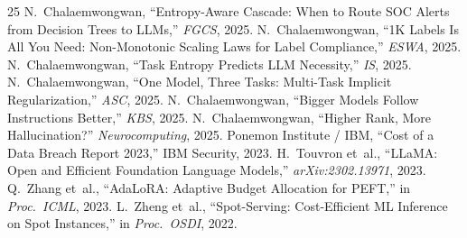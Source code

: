 \documentclass[review,3p]{elsarticle}
\begin{document}
\begin{thebibliography}{25}
 N.~Chalaemwongwan, ``Entropy-Aware Cascade: When to Route SOC Alerts from Decision Trees to LLMs,'' \emph{FGCS}, 2025.
 N.~Chalaemwongwan, ``1K Labels Is All You Need: Non-Monotonic Scaling Laws for Label Compliance,'' \emph{ESWA}, 2025.
 N.~Chalaemwongwan, ``Task Entropy Predicts LLM Necessity,'' \emph{IS}, 2025.
 N.~Chalaemwongwan, ``One Model, Three Tasks: Multi-Task Implicit Regularization,'' \emph{ASC}, 2025.
 N.~Chalaemwongwan, ``Bigger Models Follow Instructions Better,'' \emph{KBS}, 2025.
 N.~Chalaemwongwan, ``Higher Rank, More Hallucination?'' \emph{Neurocomputing}, 2025.
 Ponemon Institute / IBM, ``Cost of a Data Breach Report 2023,'' IBM Security, 2023.
 H.~Touvron et~al., ``LLaMA: Open and Efficient Foundation Language Models,'' \emph{arXiv:2302.13971}, 2023.
 Q.~Zhang et~al., ``AdaLoRA: Adaptive Budget Allocation for PEFT,'' in \emph{Proc.\ ICML}, 2023.
 L.~Zheng et~al., ``Spot-Serving: Cost-Efficient ML Inference on Spot Instances,'' in \emph{Proc.\ OSDI}, 2022.
\end{thebibliography}
\end{document}
